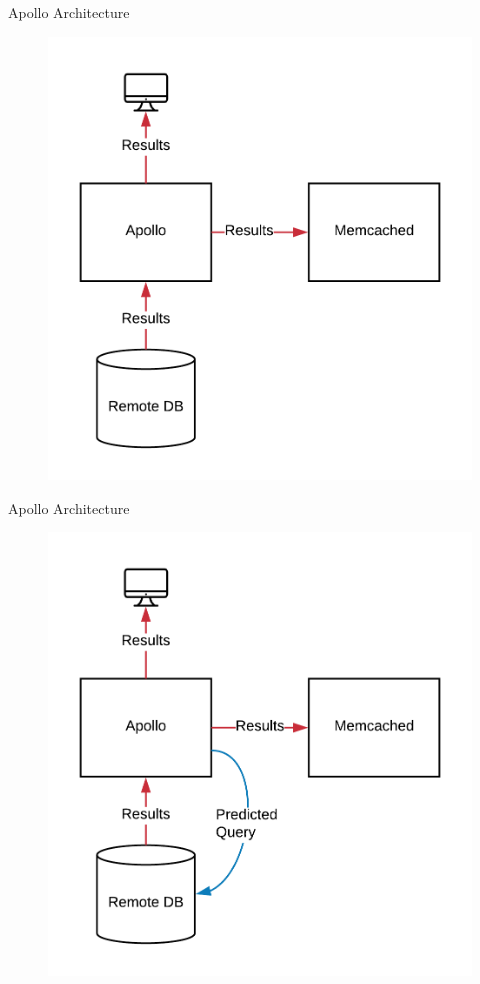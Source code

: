 \documentclass[10pt]{beamer}
\begin{document}
\begin{frame}[fragile]{Apollo Architecture}
    \begin{figure}
        \includegraphics[scale=0.17]{apollo_arch_diagram_6}
    \end{figure}
\end{frame}

\begin{frame}[fragile]{Apollo Architecture}
    \begin{figure}
        \includegraphics[scale=0.17]{apollo_arch_diagram_7}
    \end{figure}
\end{frame}
\end{document}
